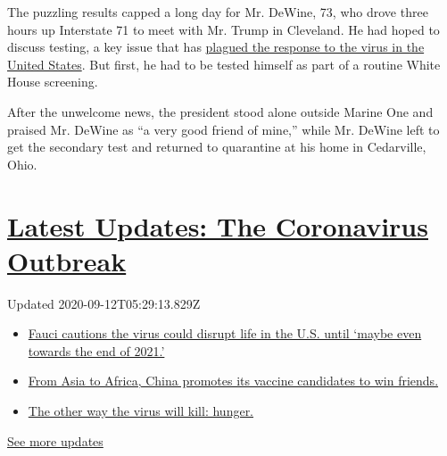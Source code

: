 The puzzling results capped a long day for Mr. DeWine, 73, who drove
three hours up Interstate 71 to meet with Mr. Trump in Cleveland. He had
hoped to discuss testing, a key issue that has
\href{https://www.nytimes3xbfgragh.onion/2020/08/04/us/virus-testing-delays.html}{plagued
the response to the virus in the United States}. But first, he had to be
tested himself as part of a routine White House screening.

After the unwelcome news, the president stood alone outside Marine One
and praised Mr. DeWine as ``a very good friend of mine,'' while Mr.
DeWine left to get the secondary test and returned to quarantine at his
home in Cedarville, Ohio.

\hypertarget{latest-updates-the-coronavirus-outbreak}{%
\section{\texorpdfstring{\href{https://www.nytimes3xbfgragh.onion/2020/09/11/world/covid-19-coronavirus.html?action=click\&pgtype=Article\&state=default\&region=MAIN_CONTENT_1\&context=storylines_live_updates}{Latest
Updates: The Coronavirus
Outbreak}}{Latest Updates: The Coronavirus Outbreak}}\label{latest-updates-the-coronavirus-outbreak}}

Updated 2020-09-12T05:29:13.829Z

\begin{itemize}
\tightlist
\item
  \href{https://www.nytimes3xbfgragh.onion/2020/09/11/world/covid-19-coronavirus.html?action=click\&pgtype=Article\&state=default\&region=MAIN_CONTENT_1\&context=storylines_live_updates\#link-dfb8a16}{Fauci
  cautions the virus could disrupt life in the U.S. until `maybe even
  towards the end of 2021.'}
\item
  \href{https://www.nytimes3xbfgragh.onion/2020/09/11/world/covid-19-coronavirus.html?action=click\&pgtype=Article\&state=default\&region=MAIN_CONTENT_1\&context=storylines_live_updates\#link-7104d154}{From
  Asia to Africa, China promotes its vaccine candidates to win friends.}
\item
  \href{https://www.nytimes3xbfgragh.onion/2020/09/11/world/covid-19-coronavirus.html?action=click\&pgtype=Article\&state=default\&region=MAIN_CONTENT_1\&context=storylines_live_updates\#link-393ad215}{The
  other way the virus will kill: hunger.}
\end{itemize}

\href{https://www.nytimes3xbfgragh.onion/2020/09/11/world/covid-19-coronavirus.html?action=click\&pgtype=Article\&state=default\&region=MAIN_CONTENT_1\&context=storylines_live_updates}{See
more updates}


